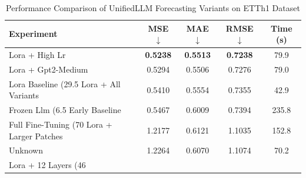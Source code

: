 \begin{table}[h]
\centering
\caption{Performance Comparison of UnifiedLLM Forecasting Variants on ETTh1 Dataset}
\label{tab:results}
\begin{tabular}{lcccc}
\toprule
\textbf{Experiment} & \textbf{MSE} $\downarrow$ & \textbf{MAE} $\downarrow$ & \textbf{RMSE} $\downarrow$ & \textbf{Time (s)} \\
\midrule
Lora + High Lr & \textbf{0.5238} & \textbf{0.5513} & \textbf{0.7238} & 79.9 \\
Lora + Gpt2-Medium & 0.5294 & 0.5506 & 0.7276 & 79.0 \\
Lora Baseline (29.5%
Lora + All Variants & 0.5410 & 0.5554 & 0.7355 & 42.9 \\
Frozen Llm (6.5%
Early Baseline & 0.5467 & 0.6009 & 0.7394 & 235.8 \\
Full Fine-Tuning (70%
Lora + Larger Patches & 1.2177 & 0.6121 & 1.1035 & 152.8 \\
Unknown & 1.2264 & 0.6070 & 1.1074 & 70.2 \\
Lora + 12 Layers (46%
\bottomrule
\end{tabular}
\end{table}
